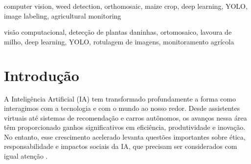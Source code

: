 \documentclass[10pt,conference]{IEEEtran}
\begin{document}
\renewcommand{\IEEEkeywordsname}{Keywords}
\begin{IEEEkeywords}
computer vision, weed detection, orthomosaic, maize crop, deep learning, YOLO, image labeling, agricultural monitoring
\end{IEEEkeywords}

\renewcommand{\abstractname}{Resumo}

\begin{abstract}
Este trabalho apresenta o desenvolvimento de um pipeline de visão computacional para a detecção de anomalias em lavouras de milho, incluindo plantas daninhas, falhas no plantio (gaps) e plantas sobrepostas. O conjunto inicial de dados consistia em imagens ortomosaicas de alta resolução fornecidas por uma empresa parceira. Devido ao tamanho e complexidade das imagens, estas foram divididas em subimagens de 600×600 pixels, resultando em 1.316 imagens. Após avaliação de qualidade, 451 imagens foram selecionadas e anotadas manualmente com uma ferramenta de rotulagem desenvolvida em Pygame. Inicialmente, foi explorado o uso do conjunto de dados Weeds-Galore e do modelo DeepLabv3, mas devido à performance limitada, a abordagem foi direcionada para a detecção de objetos baseada em YOLO. O conjunto anotado foi dividido em conjuntos de treino, validação e teste, com uma distribuição recomendada de 70\% treino, 15\% validação e 15\% teste. A solução proposta visa apoiar o monitoramento agrícola, automatizando a detecção de anomalias em imagens de grandes áreas de cultivo.
\end{abstract}

\renewcommand\IEEEkeywordsname{Palavras-chave}

\begin{IEEEkeywords}
visão computacional, detecção de plantas daninhas, ortomosaico, lavoura de milho, deep learning, YOLO, rotulagem de imagens, monitoramento agrícola
\end{IEEEkeywords}

\IEEEpeerreviewmaketitle

\section{Introdução} 

A Inteligência Artificial (IA) tem transformado profundamente a forma como interagimos com a tecnologia e com o mundo ao nosso redor. Desde assistentes virtuais até sistemas de recomendação e carros autônomos, os avanços nessa área têm proporcionado ganhos significativos em eficiência, produtividade e inovação. No entanto, esse crescimento acelerado levanta questões importantes sobre ética, responsabilidade e impactos sociais da IA, que precisam ser considerados com igual atenção \cite{garcia2020ia, pinto2020responsabilidade}.
\end{document}
